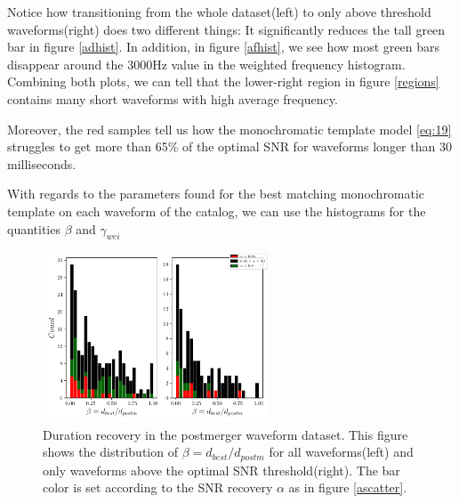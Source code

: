 Notice how transitioning from the whole dataset(left) to only above threshold waveforms(right) does two different things: It significantly reduces the tall green bar in figure \ref{adhist}. In addition, in figure \ref{afhist}, we see how most green bars disappear around the 3000Hz value in the weighted frequency histogram. Combining both plots, we can tell that the lower-right region in figure \ref{regions} contains many short waveforms with high average frequency.

Moreover, the red samples tell us how the monochromatic template model \ref{eq:19} struggles to get more than 65\% of the optimal SNR for waveforms longer than 30 milliseconds. 


\newpage 

With regards to the parameters found for the best matching monochromatic template on each waveform of the catalog, we can use the histograms for the quantities  $\beta$ and $\gamma_{wei}$ 

\begin{figure}[hbt!]
\begin{center}
\includegraphics[width=0.6\textwidth, angle=0]{images/Data_analysis/results/alpha_betahist.pdf}
\captionsetup{width=0.8\textwidth}
\caption[Duration recovery in the postmerger waveform dataset]{Duration recovery in the postmerger waveform dataset. This figure shows the distribution of $\beta=d_{best}/d_{postm}$ for all waveforms(left) and only waveforms above the optimal SNR threshold(right). The bar color is set according to the SNR recovery $\alpha$ as in figure \ref{ascatter}.}
\label{abhist}
\end{center}
\end{figure}

